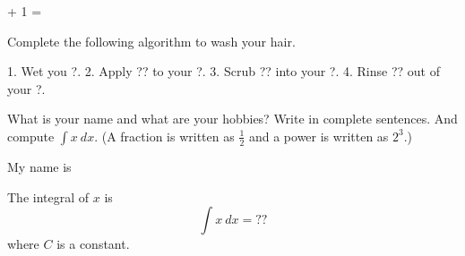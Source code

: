 

\renewcommand\AUTHOR{jdoe5@cougars.ccis.edu} %


\topmattertwo

 + 1 = \answerbox{ }

\nextq
Complete the following algorithm to wash your hair.
\\
\ANSWER
\begin{answercode}
1. Wet you ?.
2. Apply ?? to your ?.
3. Scrub ?? into your ?.
4. Rinse ?? out of your ?.
\end{answercode}

\nextq
What is your name and what are your hobbies? Write in complete sentences.
And compute $\int x \ dx$.
(A fraction is written as $\frac{1}{2}$ and a power is written as $2^{3}$.)
\\
\ANSWER
\begin{answerlong}
My name is

The integral of $x$ is
\[
\int x \ dx = ??
\]
where $C$ is a constant.
\end{answerlong}

\newpage


